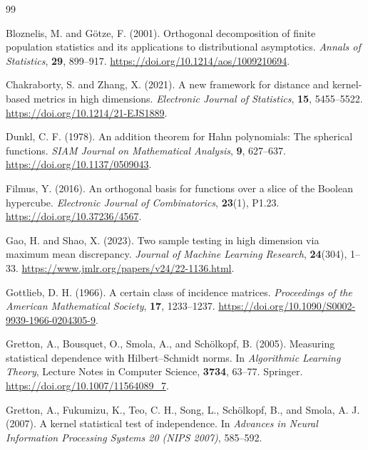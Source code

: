 \documentclass[11pt]{article}
\theoremstyle{plain}
\theoremstyle{definition}
\theoremstyle{remark}
\begin{document}
\begin{thebibliography}{99}
\small

Bloznelis, M. and G\"otze, F. (2001).
Orthogonal decomposition of finite population statistics and its applications
to distributional asymptotics.
\emph{Annals of Statistics}, \textbf{29}, 899--917.
\url{https://doi.org/10.1214/aos/1009210694}.

Chakraborty, S. and Zhang, X. (2021).
A new framework for distance and kernel-based metrics in high dimensions.
\emph{Electronic Journal of Statistics}, \textbf{15}, 5455--5522.
\url{https://doi.org/10.1214/21-EJS1889}.


Dunkl, C. F. (1978).
An addition theorem for Hahn polynomials: The spherical functions.
\emph{SIAM Journal on Mathematical Analysis}, \textbf{9}, 627--637.
\url{https://doi.org/10.1137/0509043}.

Filmus, Y. (2016).
An orthogonal basis for functions over a slice of the Boolean hypercube.
\emph{Electronic Journal of Combinatorics}, \textbf{23}(1), P1.23.
\url{https://doi.org/10.37236/4567}.

Gao, H. and Shao, X. (2023).
Two sample testing in high dimension via maximum mean discrepancy.
\emph{Journal of Machine Learning Research}, \textbf{24}(304), 1--33.
\url{https://www.jmlr.org/papers/v24/22-1136.html}.

Gottlieb, D. H. (1966).
A certain class of incidence matrices.
\emph{Proceedings of the American Mathematical Society}, \textbf{17},
1233--1237.
\url{https://doi.org/10.1090/S0002-9939-1966-0204305-9}.

Gretton, A., Bousquet, O., Smola, A., and Sch\"olkopf, B. (2005).
Measuring statistical dependence with Hilbert--Schmidt norms.
In \emph{Algorithmic Learning Theory}, Lecture Notes in Computer Science,
\textbf{3734}, 63--77. Springer.
\url{https://doi.org/10.1007/11564089_7}.

Gretton, A., Fukumizu, K., Teo, C. H., Song, L., Sch\"olkopf, B., and Smola,
A. J. (2007).
A kernel statistical test of independence.
In \emph{Advances in Neural Information Processing Systems 20 (NIPS 2007)}, 585--592.


\end{thebibliography}
\end{document}
